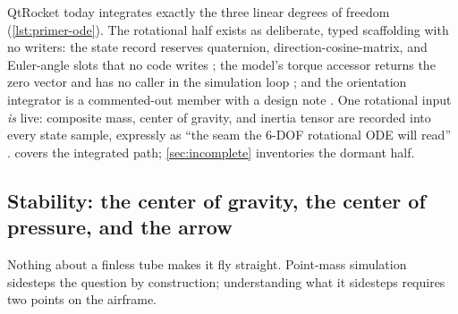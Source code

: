 QtRocket today integrates exactly the three linear degrees of freedom
(\cref{lst:primer-ode}). The rotational half exists as deliberate, typed scaffolding with
no writers: the state record reserves quaternion, direction-cosine-matrix, and Euler-angle
slots that no code writes ; the model's torque accessor returns the
zero vector and has no caller in the simulation loop ; and
the orientation integrator is a commented-out member with a design note
. One rotational input \emph{is} live: composite mass, center of
gravity, and inertia tensor are recorded into every state sample, expressly as ``the seam
the 6-DOF rotational ODE will read'' .  covers
the integrated path; \cref{sec:incomplete} inventories the dormant half.

\subsection{Stability: the center of gravity, the center of pressure, and the
arrow}\label{sec:primer-stability}

Nothing about a finless tube makes it fly straight. Point-mass simulation sidesteps the
question by construction; understanding what it sidesteps requires two points on the
airframe.

